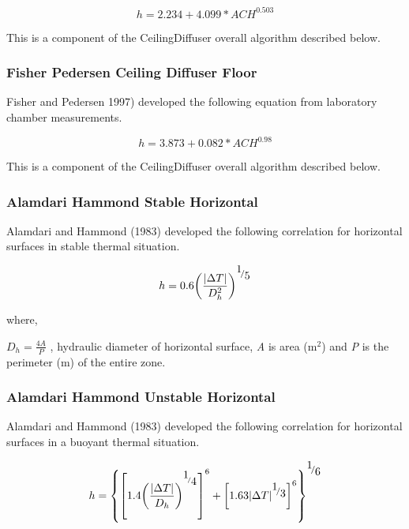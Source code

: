 \begin{equation}
h = 2.234 + 4.099 * AC{H^{0.503}}
\end{equation}

This is a component of the CeilingDiffuser overall algorithm described below.

\subsubsection{Fisher Pedersen Ceiling Diffuser Floor}\label{fisher-pedersen-ceiling-diffuser-floor}

Fisher and Pedersen 1997) developed the following equation from laboratory chamber measurements.

\begin{equation}
h = 3.873 + 0.082 * AC{H^{0.98}}
\end{equation}

This is a component of the CeilingDiffuser overall algorithm described below.

\subsubsection{Alamdari Hammond Stable Horizontal}\label{alamdari-hammond-stable-horizontal}

Alamdari and Hammond (1983) developed the following correlation for horizontal surfaces in stable thermal situation.

\begin{equation}
h = 0.6{\left( {\frac{{\left| {\Delta T} \right|}}{{D_h^2}}} \right)^{{\raise0.7ex\hbox{1} \!\mathord{\left/ {\vphantom {1 5}}\right.}\!\lower0.7ex\hbox{5}}}}
\end{equation}

where,

\({D_h} = \frac{{4A}}{P}\) , hydraulic diameter of horizontal surface, \emph{A} is area (m\(^{2}\)) and \emph{P} is the perimeter (m) of the entire zone.

\subsubsection{Alamdari Hammond Unstable Horizontal}\label{alamdari-hammond-unstable-horizontal}

Alamdari and Hammond (1983) developed the following correlation for horizontal surfaces in a buoyant thermal situation.

\begin{equation}
h = {\left\{ {{{\left[ {1.4{{\left( {\frac{{\left| {\Delta T} \right|}}{{{D_h}}}} \right)}^{^{{\raise0.7ex\hbox{1} \!\mathord{\left/ {\vphantom {1 4}}\right.}\!\lower0.7ex\hbox{4}}}}}} \right]}^6} + {{\left[ {1.63{{\left| {\Delta T} \right|}^{{\raise0.7ex\hbox{1} \!\mathord{\left/ {\vphantom {1 3}}\right.}\!\lower0.7ex\hbox{3}}}}} \right]}^6}} \right\}^{{\raise0.7ex\hbox{1} \!\mathord{\left/ {\vphantom {1 6}}\right.}\!\lower0.7ex\hbox{6}}}}
\end{equation}

